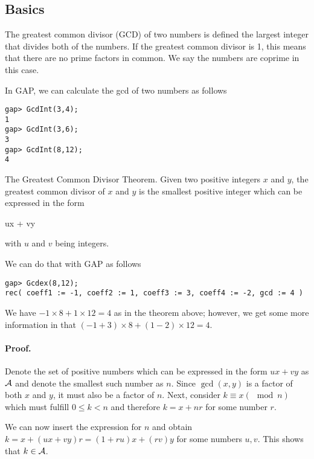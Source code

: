 
\subsection{Basics}

\begin{definition}
The greatest common divisor (GCD) of two numbers is defined the largest integer that divides both of the numbers. If the greatest common divisor is 1, this means that there are no prime factors in common. We say the numbers are coprime in this case.
\end{definition}

In GAP, we can calculate the gcd of two numbers as follows

\begin{verbatim}
gap> GcdInt(3,4);
1
gap> GcdInt(3,6);
3
gap> GcdInt(8,12);
4
\end{verbatim}

\begin{theorem}
The Greatest Common Divisor Theorem. Given two positive integers $x$ and $y$, the greatest common divisor of $x$ and $y$ is the smallest positive integer which can be expressed in the form

\bee
ux + vy
\eee

with $u$ and $v$ being integers.
\end{theorem}

We can do that with GAP as follows

\begin{verbatim}
gap> Gcdex(8,12);
rec( coeff1 := -1, coeff2 := 1, coeff3 := 3, coeff4 := -2, gcd := 4 )
\end{verbatim}

We have $-1 \times 8 + 1 \times 12 = 4$ as in the theorem above; however, we get some more information in that $(-1 + 3) \times 8 + (1 - 2) \times 12 = 4$.

\paragraph{Proof.} Denote the set of positive numbers which can be expressed in the form $ux + vy$ as $\mathcal{A}$ and denote the smallest such number as $n$. Since $\gcd(x,y)$ is a factor of both $x$ and $y$, it must also be a factor of $n$. Next, consider $k \equiv x (\mod n)$ which must fulfill $0 \leq k < n$ and therefore $k = x + nr$ for some number $r$. 

We can now insert the expression for $n$ and obtain $k = x + (ux + vy)r = (1+ru)x + (rv)y$ for some numbers $u, v$. This shows that $k \in \mathcal{A}$. 

